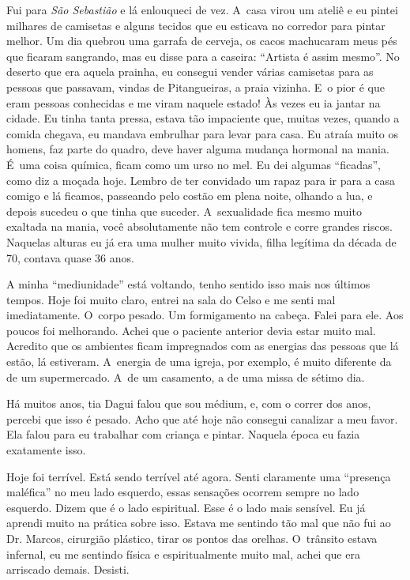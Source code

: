 Fui para \emph{São Sebastião} e lá enlouqueci de vez. A~casa virou um
ateliê e eu pintei milhares de camisetas e alguns tecidos que eu
esticava no corredor para pintar melhor. Um dia quebrou uma garrafa de
cerveja, os cacos machucaram meus pés que ficaram sangrando, mas eu
disse para a caseira: ``Artista é assim mesmo''. No deserto que era
aquela prainha, eu consegui vender várias camisetas para as pessoas que
passavam, vindas de Pitangueiras, a praia vizinha. E~o pior é que eram
pessoas conhecidas e me viram naquele estado! Às vezes eu ia
jantar na cidade. Eu tinha tanta pressa, estava tão impaciente que,
muitas vezes, quando a comida chegava, eu mandava embrulhar para levar
para casa. Eu atraía muito os homens, faz parte do quadro, deve haver
alguma mudança hormonal na mania. É~uma coisa química, ficam como
um urso no mel. Eu dei algumas ``ficadas'', como diz a moçada hoje.
Lembro de ter convidado um rapaz para ir para a casa comigo e lá ficamos,
passeando pelo costão em plena noite, olhando a lua, e depois sucedeu o que
tinha que suceder. A~sexualidade fica mesmo muito exaltada na mania, você absolutamente não tem controle e corre grandes riscos. Naquelas alturas
eu já era uma mulher muito vivida, filha legítima da década de 70, contava
quase 36 anos.

A minha ``mediunidade'' está voltando, tenho sentido isso mais nos
últimos tempos. Hoje foi muito claro, entrei na sala do Celso e me senti
mal imediatamente. O~corpo pesado. Um formigamento na cabeça. Falei para
ele. Aos poucos foi melhorando. Achei que o paciente anterior devia
estar muito mal. Acredito que os ambientes ficam impregnados com as
energias das pessoas que lá estão, lá estiveram. A~energia de uma
igreja, por exemplo, é muito diferente da de um supermercado. A~de um
casamento, a de uma missa de sétimo dia.

Há muitos anos, tia Dagui falou que sou médium, e, com o correr dos
anos, percebi que isso é pesado. Acho que até hoje não consegui
canalizar a meu favor. Ela falou para eu trabalhar com criança e pintar.
Naquela época eu fazia exatamente isso.

Hoje foi terrível. Está sendo terrível até agora. Senti claramente uma
``presença maléfica'' no meu lado esquerdo, essas sensações ocorrem
sempre no lado esquerdo. Dizem que é o lado espiritual. Esse é o lado
mais sensível. Eu já aprendi muito na prática sobre isso. Estava me
sentindo tão mal que não fui ao Dr. Marcos, cirurgião plástico, tirar os
pontos das orelhas. O~trânsito estava infernal, eu me sentindo física e
espiritualmente muito mal, achei que era arriscado demais. Desisti.

